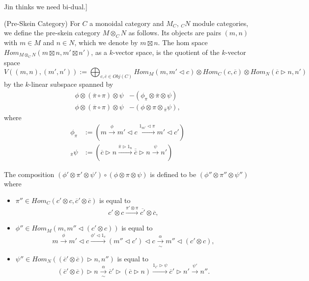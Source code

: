 Jin thinks we need bi-dual.]

\begin{definition}\label{pre-skein} (Pre-Skein Category)
  For $C$ a monoidal category and $M_C$, $_{C}N$ module categories, we define
  the pre-skein category $M\otimes_C N$ as follows. Its objects are pairs
  $(m,n)$ with $m\in M$ and $n\in N$, which we denote by $m\boxtimes n$. The
  hom space $Hom_{M\otimes_C N}(m\boxtimes n, m'\boxtimes n')$, as a
  $k$-vector space, is the quotient of the $k$-vector
  space $$V((m,n),(m',n')):=\bigoplus_{c,\overline{c} \in Obj(C)} Hom_{M}(m,
  m' \lhd c) \otimes Hom_{C}(c,\overline{c}) \otimes Hom_{N}
  (\overline{c} \rhd n, n')$$ by the $k$-linear subspace spanned by
  \begin{align}
    \phi \otimes (\overline{\pi} \circ \pi) \otimes \psi &- (\phi_{\pi} \otimes \overline{\pi} \otimes \psi) \label{relation/a} \\
    \phi \otimes (\overline{\pi} \circ \pi) \otimes \psi &- (\phi \otimes \pi \otimes {}_{\overline{\pi}}\psi) \label{relation/b},
  \end{align}
  where
  \begin{align}
    \phi_{\pi}  &:= \left( m \xrightarrow{\phi} m' \lhd c \xrightarrow{1_{m'} \lhd \pi} m' \lhd c' \right) \\
    {}_{\overline{\pi}}\psi &:= \left( \overline{c} \rhd n \xrightarrow{\overline{\pi} \rhd 1_{n}} \overline{\overline{c}} \rhd n \xrightarrow{\psi} n' \right)
  \end{align}
  
    \begin{center}
    
  \end{center}
  
  \noindent The composition $(\phi' \otimes \pi' \otimes \psi' ) \circ
  (\phi \otimes \pi \otimes \psi)$ is defined to be
  $(\phi'' \otimes \pi'' \otimes \psi'')$ where

  \begin{itemize}
    \item
    $\pi'' \in Hom_{C}(c' \otimes c, \overline{c}' \otimes \overline{c})$ is equal to
    \[
      c' \otimes c \xrightarrow{\pi' \otimes \pi} \overline{c'} \otimes \overline{c},
    \]
    \item
    \noindent $\phi'' \in Hom_{M}(m, m'' \lhd (c' \otimes c))$ is equal to
    \[
      m \xrightarrow{\phi} m' \lhd c \xrightarrow{\phi' \lhd 1_{c}} (m'' \lhd c') \lhd c \xrightarrow[\sim]{\alpha} m'' \lhd (c' \otimes c),
    \]
    \item
    \noindent $\psi'' \in Hom_{N}((\overline{c}' \otimes \overline{c}) \rhd n, n'')$ is equal to
    \[
      (\overline{c}' \otimes \overline{c}) \rhd n \xrightarrow[\sim]{\alpha} \overline{c}' \rhd (\overline{c} \rhd n) \xrightarrow{1_{\overline{c}'} \rhd \psi} \overline{c}' \rhd n' \xrightarrow{\psi'} n''.
    \]
  \end{itemize}
  

\end{definition}
